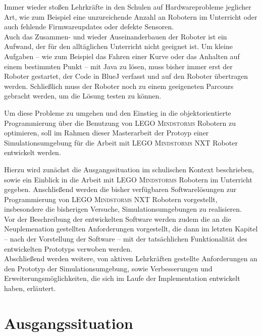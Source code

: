 \documentclass[paper=a4, DIV=calc, BCOR=12mm, twoside=on, onecolumn=on, open = right, titlepage =on, parskip =half-, headsepline = on, footsepline = off, chapterprefix = off, appendixprefix = on, fontsize = 12pt, numbers = noenddot, abstract = on]{scrbook}
\begin{document}
Immer wieder stoßen Lehrkräfte in den Schulen auf Hardwareprobleme jeglicher Art, wie zum Beispiel eine unzureichende Anzahl an Robotern im Unterricht oder auch fehlende Firmwareupdates oder defekte Sensoren.\\
Auch das Zusammen- und wieder Auseinanderbauen der Roboter ist ein Aufwand, der für den alltäglichen Unterricht nicht geeignet ist. Um kleine Aufgaben -- wie zum Beispiel das Fahren einer Kurve oder das Anhalten auf einem bestimmten Punkt -- mit Java zu lösen, muss bisher immer erst der Roboter gestartet, der Code in BlueJ verfasst und auf den Roboter übertragen werden. Schließlich muss der Roboter noch zu einem geeigeneten Parcours gebracht werden, um die Lösung testen zu können.

Um diese Probleme zu umgehen und den Einstieg in die objektorientierte Programmierung über die Benutzung von \textsc{LEGO Mindstorms} Robotern zu optimieren, soll im Rahmen dieser Masterarbeit der Protoyp einer Simulationsumgebung für die Arbeit mit \textsc{LEGO Mindstorms} NXT Roboter entwickelt werden.

Hierzu wird zunächst die Ausgangssituation im schulischen Kontext beschrieben, sowie ein Einblick in die Arbeit mit \textsc{LEGO Mindstorms} Robotern im Unterricht gegeben. Anschließend werden die bisher verfügbaren Softwarelösungen zur Programmierung von \textsc{LEGO Mindstorms} NXT Robotern vorgestellt, insbesondere die bisherigen Versuche, Simulationsumgebungen zu realisieren.\\
Vor der Beschreibung der entwickelten Software werden zudem die an die Neuplemenation gestellten Anforderungen vorgestellt, die dann im letzten Kapitel -- nach der Vorstellung der Software -- mit der tatsächlichen Funktionalität des entwickelten Prototyps verwoben werden.\\
Abschließend werden weitere, von aktiven Lehrkräften gestellte Anforderungen an den Prototyp der Simulationsumgebung, sowie Verbesserungen und Erweiterungsmöglichkeiten, die sich im Laufe der Implementation entwickelt haben, erläutert.
\newpage
\par\singlespacing
\chapter{Ausgangssituation}

\par\singlespacing
\end{document}
